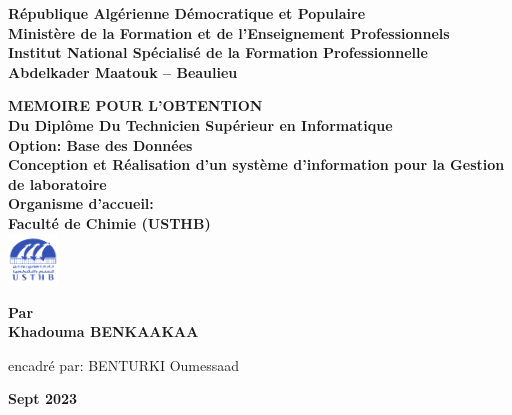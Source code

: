 \documentclass{report}
\begin{document}
\begin{titlepage}
    \begin{center}
        \textbf{\LARGE République Algérienne Démocratique et Populaire} \\
        \vspace{0.5cm}
        \textbf{\large Ministère de la Formation et de l'Enseignement Professionnels \\ Institut National Spécialisé de la Formation Professionnelle} \\
        \textbf{\large Abdelkader Maatouk – Beaulieu} \\
        \vspace{1cm}
        
        \vspace{0.5cm}
        \textbf{\Large MEMOIRE POUR L'OBTENTION} \\
        \vspace{0.5cm}
        \textbf{\Large Du Diplôme Du Technicien Supérieur en Informatique} \\
        \textbf{\Large Option: Base des Données} \\
        \vspace{1cm}
        \textbf{\huge Conception et Réalisation d'un système d'information pour la Gestion de laboratoire } \\
        \vspace{1cm}
        \textbf{\large Organisme d'accueil: \\
        Faculté de Chimie (USTHB) } \\
        \vspace{0.5cm}
        \includegraphics[width=0.1\textwidth]{images/usthb.png} 
        
        \vfill     
         {\Large\textbf{Par \\ \vspace{0.5cm} Khadouma BENKAAKAA}}
  
          \vfill
          \vspace{1cm}
          {\large{encadré par: BENTURKI Oumessaad}}
          \vspace{1cm}
          
          {\large\textbf{Sept 2023}}
        
    \end{center}
\end{titlepage}
\end{document}
